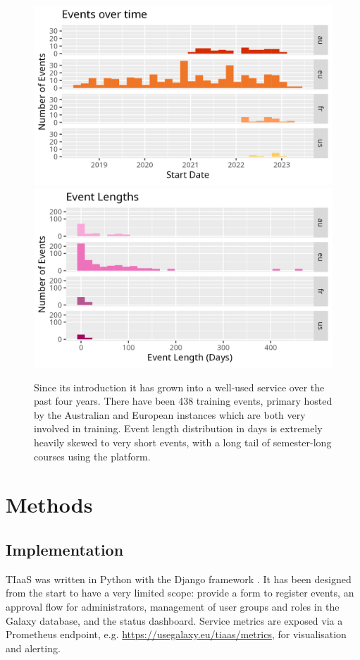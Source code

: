 \documentclass[a4paper,num-refs]{oup-contemporary}
\begin{document}
\begin{figure}[bt!]
\centering
	\includegraphics[width=\linewidth]{images/event-starts.png}
	\includegraphics[width=\linewidth]{images/event-lengths.png}
	\caption{Since its introduction it has grown into a well-used service over the past four years. There have been 438 training events, primary hosted by the Australian and European instances which are both very involved in training. Event length distribution in days is extremely heavily skewed to very short events, with a long tail of semester-long courses using the platform.}\label{figure:graphs}
\end{figure}

\section{Methods}

\subsection{Implementation}
TIaaS was written in Python with the Django framework \cite{django}. It has been designed from the start to have a very limited scope: provide a form to register events, an approval flow for administrators, management of user groups and roles in the Galaxy database, and the status dashboard. Service metrics are exposed via a Prometheus \cite{Prometheus} endpoint, e.g. \url{https://usegalaxy.eu/tiaas/metrics}, for visualisation and alerting.
\end{document}

